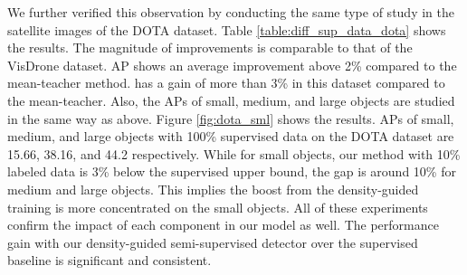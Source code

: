 We further verified this observation  by conducting the same type of study in the satellite images of the DOTA dataset. Table \ref{table:diff_sup_data_dota} shows the results. The magnitude of improvements is comparable to that of the VisDrone dataset. AP shows an average improvement above 2\% compared to the mean-teacher method.  has a gain of more than 3\% in this dataset compared to the mean-teacher. Also, the APs of small, medium, and large objects are studied in the same way as above. Figure \ref{fig:dota_sml} shows the results. APs of small, medium, and large objects with 100\% supervised data on the DOTA dataset are 15.66, 38.16, and 44.2 respectively. While for small objects, our method with 10\% labeled data is 3\% below the supervised upper bound, the gap is around 10\% for medium and large objects. This implies the boost from the density-guided training is more concentrated on the small objects. All of these experiments confirm the impact of each component in our model as well. The performance gain with our density-guided semi-supervised detector over the supervised baseline is significant and consistent.
\begin{comment}
\begin{table*}
    \centering
    \begin{tabular}{l||rrr|rrr|rrr|r}
    \hline
    \textbf{Settings} & \multicolumn{3}{|c|}{1\% (\#L=64)} & \multicolumn{3}{|c|}{5\% (\#L=323)} & \multicolumn{3}{|c|}{10\% (\#L=647)} & FPS\\
    \hline
     & \textbf{AP} & \textbf{} & \textbf{} &  \textbf{AP} & \textbf{} & \textbf{} & \textbf{AP} & \textbf{} & \textbf{} &  \\
     \hline
     Supervised & 5.56 & 12.39 & 3.92 & 14.55 & 25.52 & 14.27 & 19.18 & 34.44 & 18.40 & 0.50 \\
     Supervised + Dcrop & 6.80 & 14.19 & 5.51 & 15.97 & 28.98 & 15.74 & 20.43 & 36.50 & 20.27 & 0.92 \\
     \hline
     SSOD & 8.78 & 16.18 & 8.25 & 16.78 & 29.59 & 16.11 & 23.15 & 39.49 & 23.86 & 0.50 \\
     SSOD + Dcrop (L) & 9.74 & 18.44 & 8.96 & 18.42 & 31.62 & 18.26 &  24.34 & 42.30 & 24.29 & 0.92 \\
     SSOD + Dcrop (L + U) & \textbf{10.32} & \textbf{19.70} & \textbf{9.33} & \textbf{19.96} & \textbf{34.78} & \textbf{19.65} & \textbf{25.17} & \textbf{43.07} & \textbf{24.57} & 0.92\\
    \hline  
    \end{tabular}
    \caption{Performance comparison of our density crop guided semi-supervised object detection with 1\%, 5\%, and 10\% labeled images on the DOTA dataset. The detection speed is also reported in FPS. SSOD - semi-supervised detection with mean-teacher, Dcrop(L) - density crops on the labeled images, Dcrop (L + U) - density crops on the labeled and unlabeled images.}
    \label{table:diff_sup_data_dota}
\end{table*}
\end{comment}

